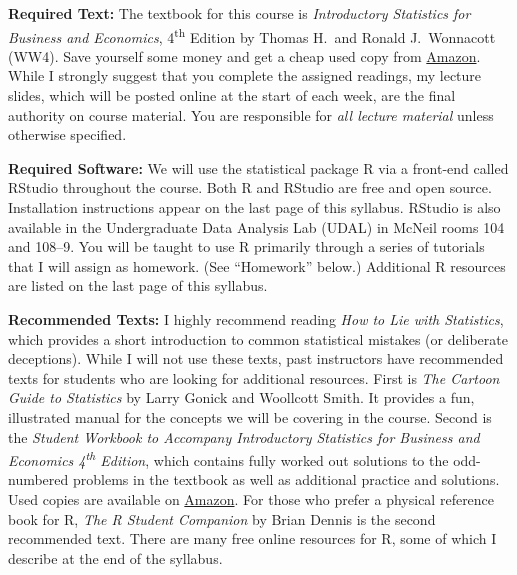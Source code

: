 \documentclass[11pt, letterpaper]{article}
\begin{document}
\medskip

\noindent \textbf{Required Text:} 
The textbook for this course is \emph{Introductory Statistics for Business and Economics}, 4\textsuperscript{th} Edition by Thomas H.\ and Ronald J.\ Wonnacott (WW4). 
Save yourself some money and get a cheap used copy from \href{http://tinyurl.com/ECON103-2013A}{Amazon}.
While I strongly suggest that you complete the assigned readings, my lecture slides, which will be posted online at the start of each week, are the final authority on course material. 
You are responsible for \emph{all lecture material} unless otherwise specified.

\medskip

\noindent \textbf{Required Software:} 
We will use the statistical package R via a front-end called RStudio throughout the course. 
Both R and RStudio are free and open source. Installation instructions appear on the last page of this syllabus.
RStudio is also available in the Undergraduate Data Analysis Lab (UDAL) in McNeil rooms 104 and 108--9. 
You will be taught to use R primarily through a series of tutorials that I will assign as homework. (See ``Homework'' below.)  
Additional R resources are listed on the last page of this syllabus.

\medskip

\noindent \textbf{Recommended Texts:} 
I highly recommend reading \textit{How to Lie with Statistics}, which provides a short introduction to common statistical mistakes (or deliberate deceptions). 
While I will not use these texts, past instructors have recommended  texts for students who are looking for additional resources. 
First is \textit{The Cartoon Guide to Statistics} by Larry Gonick and Woollcott Smith. It provides a fun, illustrated manual for the concepts we will be covering in the course.
Second is the \emph{Student Workbook to Accompany Introductory Statistics for Business and Economics 4\textsuperscript{th} Edition}, which contains fully worked out solutions to the odd-numbered problems in the textbook as well as additional practice and solutions. 
Used copies are available on \href{http://www.amazon.com/gp/offer-listing/0471508993/sr=/qid=/ref=olp_page_2?ie=UTF8&colid=&coliid=&condition=all&me=&qid=&shipPromoFilter=0&sort=sip&sr=&startIndex=10}{Amazon}. 
For those who prefer a physical reference book for R, \emph{The R Student Companion} by Brian Dennis is the second recommended text. 
There are many free online resources for R, some of which I describe at the end of the syllabus.
\end{document}
